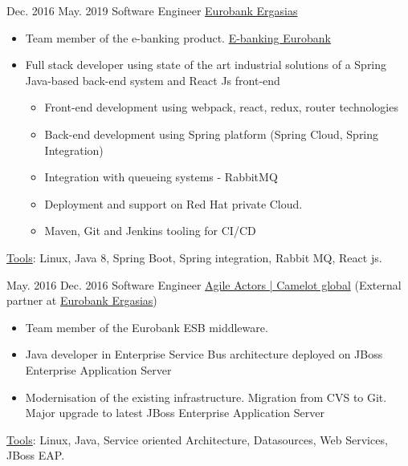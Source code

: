 \documentclass[letterpaper]{style/twentysecondcv} %
\begin{document}
\begin{twenty}
{			\vspace{1.0em}
		}	
	\twentyplusitem
		{Dec. 2016}
		{May. 2019}
		{Software Engineer}
		{\href{https://www.eurobank.gr/en/group}{Eurobank Ergasias}}
		{}
		{%
			\begin{itemize}
				\item Team member of the e-banking product. \href{https://ebanking.eurobank.gr}{E-banking Eurobank}
				\item Full stack developer using state of the art industrial solutions of a Spring Java-based back-end system and React Js front-end
				\begin{itemize}
					\item Front-end development using webpack, react, redux, router technologies
					\item Back-end development using Spring platform (Spring Cloud, Spring Integration)
					\item Integration with queueing systems - RabbitMQ
					\item Deployment and support on Red Hat private Cloud.
					\item Maven, Git and Jenkins tooling for CI/CD 
				\end{itemize}
			\end{itemize}
			\vspace{0.5em}
			\underline{Tools}: Linux, Java 8, Spring Boot, Spring integration, Rabbit MQ, React js.
			\vspace{1.0em}
		}
	\twentyplusitem
		{May. 2016}
		{Dec. 2016}
		{Software Engineer}
		{\href{https://www.agileactors.com/}{Agile Actors | Camelot global} (External partner at \href{https://www.eurobank.gr/en/group}{Eurobank Ergasias})}
		{}
		{%
			\begin{itemize}
				\item Team member of the Eurobank ESB middleware.
				\item Java developer in Enterprise Service Bus architecture deployed on JBoss Enterprise Application Server
				\item Modernisation of the existing infrastructure. Migration from CVS to Git. Major upgrade to latest JBoss Enterprise Application Server
			\end{itemize}%
			\vspace{0.5em}
			\underline{Tools}: Linux, Java, Service oriented Architecture, Datasources, Web Services, JBoss EAP.
			\vspace{1.0em}
		}
\end{twenty}
\end{document}
